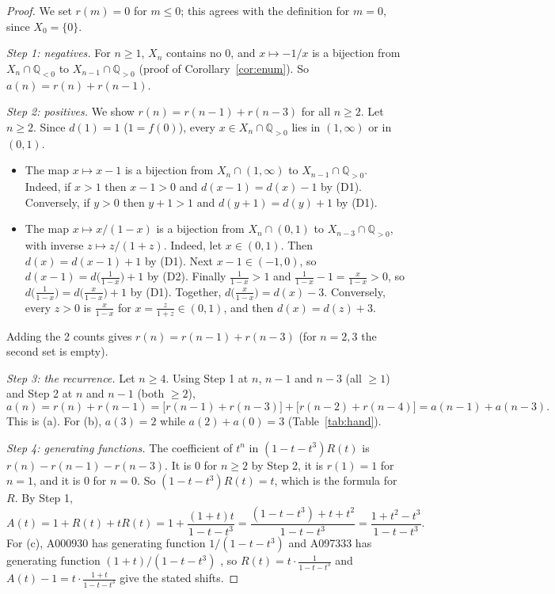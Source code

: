 \documentclass[11pt]{article}
\theoremstyle{definition}
\theoremstyle{remark}
\newcommand{\Q}{\mathbb{Q}}
\newcommand{\Qpos}{\Q_{>0}}
\newcommand{\Qneg}{\Q_{<0}}
\begin{document}
\begin{proof}
We set $r(m)=0$ for $m\le0$; this agrees with the definition for $m=0$, since $X_0=\{0\}$.

\emph{Step 1: negatives.} For $n\ge1$, $X_n$ contains no $0$, and $x\mapsto-1/x$ is a bijection from
$X_n\cap\Qneg$ to $X_{n-1}\cap\Qpos$ (proof of Corollary~\ref{cor:enum}). So $a(n)=r(n)+r(n-1)$.

\emph{Step 2: positives.} We show $r(n)=r(n-1)+r(n-3)$ for all $n\ge2$. Let $n\ge2$. Since
$d(1)=1$ ($1=f(0)$), every $x\in X_n\cap\Qpos$ lies in $(1,\infty)$ or in $(0,1)$.
\begin{itemize}[itemsep=1pt,topsep=2pt]
\item The map $x\mapsto x-1$ is a bijection from $X_n\cap(1,\infty)$ to $X_{n-1}\cap\Qpos$. Indeed,
if $x>1$ then $x-1>0$ and $d(x-1)=d(x)-1$ by (D1). Conversely, if $y>0$ then $y+1>1$ and
$d(y+1)=d(y)+1$ by (D1).
\item The map $x\mapsto x/(1-x)$ is a bijection from $X_n\cap(0,1)$ to $X_{n-3}\cap\Qpos$, with
inverse $z\mapsto z/(1+z)$. Indeed, let $x\in(0,1)$. Then $d(x)=d(x-1)+1$ by (D1). Next
$x-1\in(-1,0)$, so $d(x-1)=d\bigl(\tfrac1{1-x}\bigr)+1$ by (D2). Finally $\tfrac1{1-x}>1$ and
$\tfrac1{1-x}-1=\tfrac{x}{1-x}>0$, so $d\bigl(\tfrac1{1-x}\bigr)=d\bigl(\tfrac{x}{1-x}\bigr)+1$ by
(D1). Together, $d\bigl(\tfrac{x}{1-x}\bigr)=d(x)-3$. Conversely, every $z>0$ is
$\tfrac{x}{1-x}$ for $x=\tfrac{z}{1+z}\in(0,1)$, and then $d(x)=d(z)+3$.
\end{itemize}
Adding the 2 counts gives $r(n)=r(n-1)+r(n-3)$ (for $n=2,3$ the second set is empty).

\emph{Step 3: the recurrence.} Let $n\ge4$. Using Step 1 at $n$, $n-1$ and $n-3$ (all $\ge1$) and
Step 2 at $n$ and $n-1$ (both $\ge2$),
\[
a(n)=r(n)+r(n-1)=\bigl[r(n-1)+r(n-3)\bigr]+\bigl[r(n-2)+r(n-4)\bigr]=a(n-1)+a(n-3).
\]
This is (a). For (b), $a(3)=2$ while $a(2)+a(0)=3$ (Table~\ref{tab:hand}).

\emph{Step 4: generating functions.} The coefficient of $t^n$ in $(1-t-t^3)R(t)$ is
$r(n)-r(n-1)-r(n-3)$. It is $0$ for $n\ge2$ by Step 2, it is $r(1)=1$ for $n=1$, and it is $0$ for
$n=0$. So $(1-t-t^3)R(t)=t$, which is the formula for $R$. By Step 1,
\[
A(t)=1+R(t)+tR(t)=1+\frac{(1+t)t}{1-t-t^3}=\frac{(1-t-t^3)+t+t^2}{1-t-t^3}=\frac{1+t^2-t^3}{1-t-t^3}.
\]
For (c), A000930 has
generating function $1/(1-t-t^3)$ and A097333 has generating function $(1+t)/(1-t-t^3)$
\cite{oeisA000930,oeisA097333}, so $R(t)=t\cdot\frac1{1-t-t^3}$ and
$A(t)-1=t\cdot\frac{1+t}{1-t-t^3}$ give the stated shifts.
\end{proof}
\end{document}
